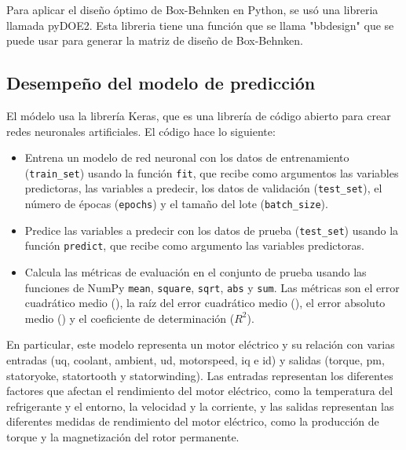 \documentclass{article}
\begin{document}
Para aplicar el diseño óptimo de Box-Behnken en Python, se usó una libreria llamada pyDOE2. Esta libreria tiene una función que se llama "bbdesign" que se puede usar para generar la matriz de diseño de Box-Behnken.



\subsection{Desempeño del modelo de predicción}

El módelo usa la librería Keras, que es una librería de código abierto para crear redes neuronales artificiales. El código hace lo siguiente:

\begin{itemize}
\item Entrena un modelo de red neuronal con los datos de entrenamiento (\lstinline{train_set}) usando la función \lstinline{fit}, que recibe como argumentos las variables predictoras, las variables a predecir, los datos de validación (\lstinline{test_set}), el número de épocas (\lstinline{epochs}) y el tamaño del lote (\lstinline{batch_size}).
\item Predice las variables a predecir con los datos de prueba (\lstinline{test_set}) usando la función \lstinline{predict}, que recibe como argumento las variables predictoras.
\item Calcula las métricas de evaluación en el conjunto de prueba usando las funciones de NumPy \lstinline{mean}, \lstinline{square}, \lstinline{sqrt}, \lstinline{abs} y \lstinline{sum}. Las métricas son el error cuadrático medio (), la raíz del error cuadrático medio (), el error absoluto medio () y el coeficiente de determinación ($R^{2}$).
\end{itemize}



En particular, este modelo representa un motor eléctrico y su relación con varias entradas (u\textunderscore q, coolant, ambient, u\textunderscore d, motor\textunderscore speed, i\textunderscore q e i\textunderscore d) y salidas (torque, pm, stator\textunderscore yoke, stator\textunderscore tooth y stator\textunderscore winding). Las entradas representan los diferentes factores que afectan el rendimiento del motor eléctrico, como la temperatura del refrigerante y el entorno, la velocidad y la corriente, y las salidas representan las diferentes medidas de rendimiento del motor eléctrico, como la producción de torque y la magnetización del rotor permanente.
\end{document}
